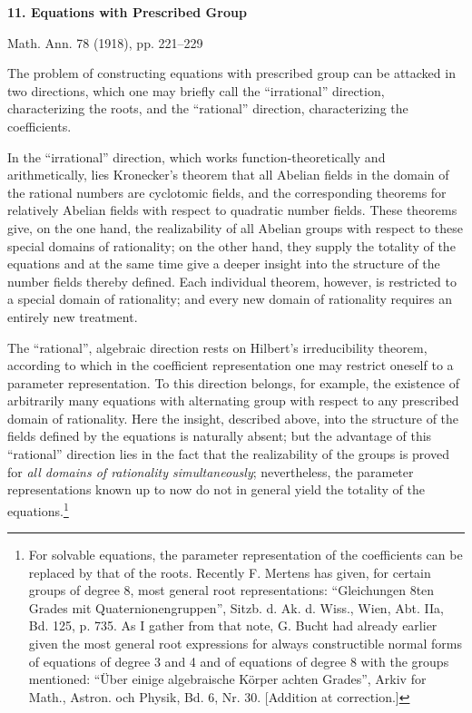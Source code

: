 \documentclass[11pt]{article}
\begin{document}
\clearpage
\begin{center}
{\Large\bfseries 11. Equations with Prescribed Group}\par
\vspace{1.5em}
Math. Ann. 78 (1918), pp. 221--229
\end{center}

\vspace{4em}

The problem of constructing equations with prescribed group can be attacked in two directions, which one may briefly call the ``irrational'' direction, characterizing the roots, and the ``rational'' direction, characterizing the coefficients.

In the ``irrational'' direction, which works function-theoretically and arithmetically, lies Kronecker's theorem that all Abelian fields in the domain of the rational numbers are cyclotomic fields, and the corresponding theorems for relatively Abelian fields with respect to quadratic number fields. These theorems give, on the one hand, the realizability of all Abelian groups with respect to these special domains of rationality; on the other hand, they supply the totality of the equations and at the same time give a deeper insight into the structure of the number fields thereby defined. Each individual theorem, however, is restricted to a special domain of rationality; and every new domain of rationality requires an entirely new treatment.

The ``rational'', algebraic direction rests on Hilbert's irreducibility theorem, according to which in the coefficient representation one may restrict oneself to a parameter representation. To this direction belongs, for example, the existence of arbitrarily many equations with alternating group with respect to any prescribed domain of rationality. Here the insight, described above, into the structure of the fields defined by the equations is naturally absent; but the advantage of this ``rational'' direction lies in the fact that the realizability of the groups is proved for \emph{all domains of rationality simultaneously}; nevertheless, the parameter representations known up to now do not in general yield the totality of the equations.\footnote{For solvable equations, the parameter representation of the coefficients can be replaced by that of the roots. Recently F. Mertens has given, for certain groups of degree 8, most general root representations: ``Gleichungen 8ten Grades mit Quaternionengruppen'', Sitzb. d. Ak. d. Wiss., Wien, Abt. IIa, Bd. 125, p. 735. As I gather from that note, G. Bucht had already earlier given the most general root expressions for always constructible normal forms of equations of degree 3 and 4 and of equations of degree 8 with the groups mentioned: ``Über einige algebraische Körper achten Grades'', Arkiv for Math., Astron. och Physik, Bd. 6, Nr. 30. [Addition at correction.]} 
\end{document}
